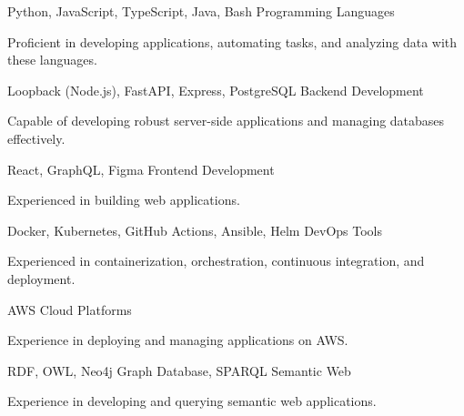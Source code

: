 \begin{cventries}
  \cventry
  {Python, JavaScript, TypeScript, Java, Bash}
  {Programming Languages}
  {}
  {}
  {
    \begin{cvitems}
      \item {Proficient in developing applications, automating tasks, and analyzing data with these languages.}
    \end{cvitems}
  }

  \cventry
  {Loopback (Node.js), FastAPI, Express, PostgreSQL}
  {Backend Development}
  {}
  {}
  {
    \begin{cvitems}
      \item{Capable of developing robust server-side applications and managing databases effectively.}
    \end{cvitems}
  }

  \cventry
  {React, GraphQL, Figma}
  {Frontend Development}
  {}
  {}
  {
    \begin{cvitems}
      \item {Experienced in building web applications.}
    \end{cvitems}
  }

  \cventry
  {Docker, Kubernetes, GitHub Actions, Ansible, Helm}
  {DevOps Tools}
  {}
  {}
  {
    \begin{cvitems}
      \item {Experienced in containerization, orchestration, continuous integration, and deployment.}
    \end{cvitems}
  }

  \cventry
  {AWS}
  {Cloud Platforms}
  {}
  {}
  {
    \begin{cvitems}
      \item {Experience in deploying and managing applications on AWS.}
    \end{cvitems}
  }


  \cventry
  {RDF, OWL, Neo4j Graph Database, SPARQL}
  {Semantic Web}
  {}
  {}
  {
    \begin{cvitems}
      \item {Experience in developing and querying semantic web applications.}
    \end{cvitems}
  }

\end{cventries}